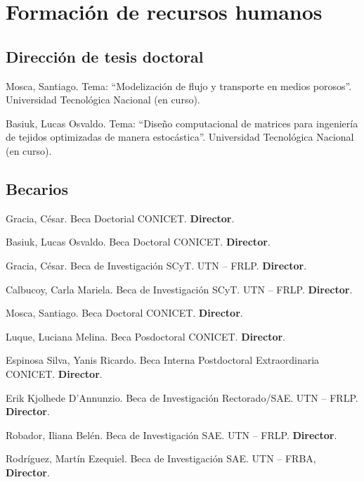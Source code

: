 \section{Formación de recursos humanos}

\subsection{Dirección de tesis doctoral}

 Mosca, Santiago. Tema: ``Modelización de flujo y transporte en medios porosos''. Universidad Tecnológica Nacional (en curso).

 Basiuk, Lucas Osvaldo. Tema: ``Diseño computacional de matrices para ingeniería de tejidos optimizadas de manera estocástica''. Universidad Tecnológica Nacional  (en curso).

\subsection{Becarios}

     Gracia, César. Beca Doctorial CONICET. \textbf{Director}.

     Basiuk, Lucas Osvaldo. Beca Doctoral CONICET. \textbf{Director}.

     Gracia, César. Beca de Investigación SCyT. UTN -- FRLP. \textbf{Director}.

     Calbucoy, Carla Mariela. Beca de Investigación SCyT. UTN -- FRLP. \textbf{Director}.

     Mosca, Santiago. Beca Doctoral CONICET. \textbf{Director}.

     Luque, Luciana Melina. Beca Posdoctoral CONICET. \textbf{Director}.

     Espinosa Silva, Yanis Ricardo. Beca Interna Postdoctoral Extraordinaria CONICET. \textbf{Director}.

     Erik Kjolhede D'Annunzio. Beca de Investigación Rectorado/SAE. UTN -- FRLP. \textbf{Director}.

     Robador, Iliana Belén. Beca de Investigación SAE. UTN -- FRLP. \textbf{Director}.

     Rodríguez, Martín Ezequiel. Beca de Investigación SAE. UTN -- FRBA, \textbf{Director}.

